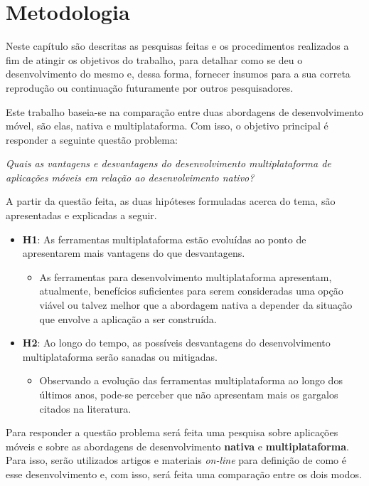 \chapter{Metodologia} \label{cap:metodologia}
Neste capítulo são descritas as pesquisas feitas e os procedimentos realizados a 
fim de atingir os objetivos do trabalho, para detalhar como se deu o desenvolvimento do mesmo e, 
dessa forma, fornecer insumos para a sua correta reprodução ou continuação futuramente por outros pesquisadores.

Este trabalho baseia-se na comparação entre duas abordagens de desenvolvimento móvel, são elas, nativa e multiplataforma. 
Com isso, o objetivo principal é responder a seguinte questão problema:
\begin{center}
    \textit{Quais as vantagens e desvantagens do desenvolvimento multiplataforma de aplicações móveis em relação ao desenvolvimento nativo?}
\end{center}

A partir da questão feita, as duas hipóteses formuladas acerca do tema, são apresentadas e explicadas a seguir.

\begin{itemize}
    \item \textbf{H1}: As ferramentas multiplataforma estão evoluídas ao ponto de apresentarem mais vantagens do que desvantagens.
        \begin{itemize}
            \item As ferramentas para desenvolvimento multiplataforma apresentam, atualmente, benefícios suficientes para serem consideradas uma opção viável ou talvez melhor que a abordagem nativa
            a depender da situação que envolve a aplicação a ser construída. 
        \end{itemize}
    \item \textbf{H2}: Ao longo do tempo, as possíveis desvantagens do desenvolvimento multiplataforma serão sanadas ou mitigadas.
        \begin{itemize}
            \item Observando a evolução das ferramentas multiplataforma ao longo dos últimos anos, pode-se perceber que não apresentam mais os gargalos citados na literatura.
        \end{itemize}
\end{itemize}

Para responder a questão problema será feita uma pesquisa sobre aplicações móveis e sobre as abordagens de desenvolvimento \textbf{nativa} e \textbf{multiplataforma}.
Para isso, serão utilizados artigos e materiais \textit{on-line} para definição de como é esse desenvolvimento e, com isso, será feita uma comparação entre os dois modos. 

